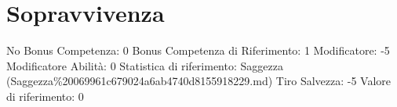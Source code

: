 \section{Sopravvivenza}\label{sopravvivenza}

\begin{description}
\tightlist
\item[Tags: ABI]
No Bonus Competenza: 0 Bonus Competenza di Riferimento: 1 Modificatore:
-5 Modificatore Abilità: 0 Statistica di riferimento: Saggezza
(Saggezza\%20069961c679024a6ab4740d8155918229.md) Tiro Salvezza: -5
Valore di riferimento: 0
\end{description}

